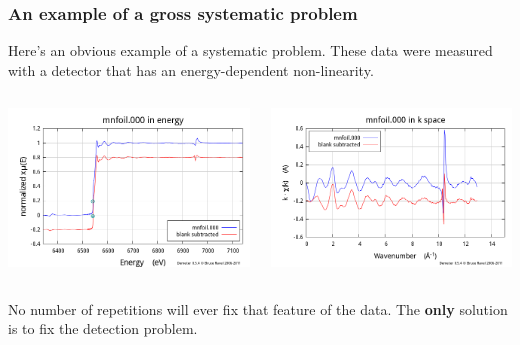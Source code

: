 \documentclass[10pt, xcolor=x11names, compress]{beamer}
\begin{document}
\begin{frame}
  \frametitle{An example of a gross systematic problem}

  Here's an obvious example of a systematic problem.  These data were
  measured with a detector that has an energy-dependent non-linearity.

  \begin{columns}[T]
    \begin{column}{0.5\linewidth}
      \includegraphics[width=\linewidth]{images/mnxmu.png}      
    \end{column}
    \begin{column}{0.5\linewidth}
      \includegraphics[width=\linewidth]{images/mnchik.png}      
    \end{column}
  \end{columns}

  \bigskip

  \begin{alertblock}{}
    No number of repetitions will ever fix that feature of the data.
    The \textbf{only} solution is to fix the detection problem.
  \end{alertblock}
\end{frame}
\end{document}
